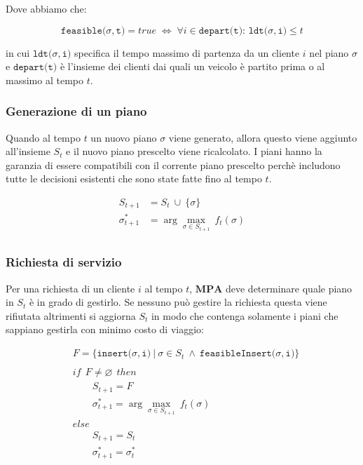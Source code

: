 \documentclass[
]{article}
\begin{document}
Dove abbiamo che:

\[\texttt{feasible(}\sigma,\texttt{t)} = true\;\Longleftrightarrow\;\forall i \in \texttt{depart(t):\ ldt(}\sigma,\texttt{i)} \leq t\]

in cui {\(\texttt{ldt(}\sigma,\texttt{i)}\)} specifica il tempo massimo
di partenza da un cliente {\(i\)} nel piano {\(\sigma\)} e
{\(\texttt{depart(t)}\)} è l'insieme dei clienti dai quali un veicolo è
partito prima o al massimo al tempo {\(t\)}.

\hypertarget{generazione-di-un-piano}{%
\subsubsection{Generazione di un piano}\label{generazione-di-un-piano}}

Quando al tempo {\(t\)} un nuovo piano {\(\sigma\)} viene generato,
allora questo viene aggiunto all'insieme {\(S_{t}\)} e il nuovo piano
prescelto viene ricalcolato. I piani hanno la garanzia di essere
compatibili con il corrente piano prescelto perchè includono tutte le
decisioni esistenti che sono state fatte fino al tempo {\(t\)}.

\begin{equation*}
    \begin{split}
        S_{t + 1} & {= S_{t}\  \cup \ \{\sigma\}} \\
\sigma_{t + 1}^{\ast} & {= \arg\max\limits_{\sigma \in S_{t + 1}}\ f_{t}(\sigma)} \\
    \end{split}
\end{equation*}

\hypertarget{richiesta-di-servizio}{%
\subsubsection{Richiesta di servizio}\label{richiesta-di-servizio}}

Per una richiesta di un cliente {\(i\)} al tempo {\(t\)},
{\(\mathbf{MPA}\)} deve determinare quale piano in {\(S_{t}\)} è in
grado di gestirlo. Se nessuno può gestire la richiesta questa viene rifiutata
altrimenti si aggiorna {\(S_{t}\)} in modo che contenga solamente i
piani che sappiano gestirla con minimo costo di viaggio:

\begin{equation*}
    \begin{split}
         & {F = \{\texttt{insert(}\sigma,\texttt{i)}\ |\ \sigma \in S_{t}\  \land \ \texttt{feasibleInsert(}\sigma,\texttt{i)}\}} \\
 & \\
 & {if\ \ F \neq \varnothing\ \ then} \\
 & {\qquad S_{t + 1} = F} \\
 & {\qquad\sigma_{t + 1}^{\ast} = \arg\max\limits_{\sigma \in S_{t + 1}}\ f_{t}(\sigma)} \\
 & {else} \\
 & {\qquad S_{t + 1} = S_{t}} \\
 & {\qquad\sigma_{t + 1}^{\ast} = \sigma_{t}^{\ast}} \\
    \end{split}
\end{equation*}
\end{document}
